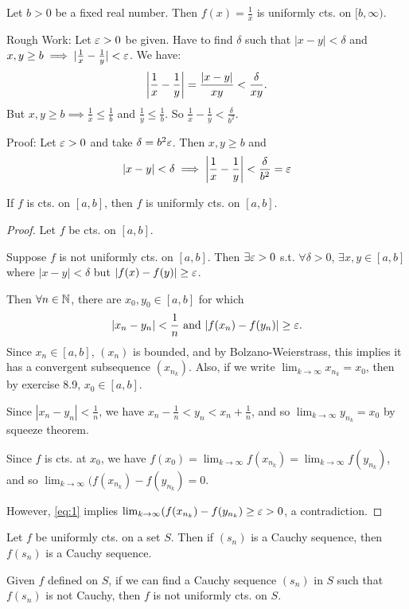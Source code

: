 \documentclass{article}
\begin{document}
\begin{example}
Let $b > 0$ be a fixed real number. Then $f(x) = \frac{1}{x}$ is uniformly cts. on $[b, \infty)$.

Rough Work:
Let $\varepsilon > 0$ be given. Have to find $\delta$ such that $|x-y| < \delta$ and $x, y \geq b \implies |\frac{1}{x} - \frac{1}{y}| < \varepsilon$.
We have:
\[
\abs{\frac{1}{x} - \frac{1}{y}} = \frac{\abs{x-y}}{xy} < \frac{\delta}{xy}.
\]
But $x, y \geq b \implies \frac{1}{x} \leq \frac{1}{b}$ and $\frac{1}{y} \leq \frac{1}{b}$. So $\frac{1}{x} - \frac{1}{y} < \frac{\delta}{b^2}$.

Proof:
Let $\varepsilon > 0$ and take $\delta = b^2\varepsilon$. Then $x, y \geq b$ and \[
|x-y| < \delta \implies \abs{\frac{1}{x} - \frac{1}{y}} < \frac{\delta}{b^2} = \varepsilon
\]
\end{example}
\begin{cthm}[Theorem 19.2]
If $f$ is cts. on $[a, b]$, then $f$ is uniformly cts. on $[a, b]$.
\end{cthm}
\begin{proof}
Let $f$ be cts. on $[a, b]$. 

Suppose $f$ is not uniformly cts. on $[a, b]$. Then $\exists \varepsilon > 0$ s.t. $\forall \delta > 0$, $\exists x, y \in [a, b]$ where $|x-y| < \delta$ but $|f(x) -f(y)| \geq \varepsilon$.

Then $\forall n \in \mathbb{N}$, there are $x_0, y_0 \in [a, b]$ for which \begin{equation} \label{eq:1}
    |x_n - y_n| < \frac{1}{n}\text{ and }|f(x_n) - f(y_n)| \geq \varepsilon.
\end{equation}
Since $x_n \in [a, b]$, $(x_n)$ is bounded, and by Bolzano-Weierstrass, this implies it has a convergent subsequence $(x_{n_k})$.
Also, if we write $\lim_{k\to\infty} x_{n_k} = x_0$, then by exercise 8.9, $x_0 \in [a, b]$.

Since $|x_n -y_n| < \frac{1}{n}$, we have $x_n - \frac{1}{n} < y_n < x_n + \frac{1}{n}$, and so $\lim_{k\to\infty} y_{n_k} = x_0$ by squeeze theorem. 

Since $f$ is cts. at $x_0$, we have $f(x_0) = \lim_{k\to\infty} f(x_{n_k}) = \lim_{k\to\infty} f(y_{n_k})$, and so $\lim_{k\to\infty} (f(x_{n_k}) - f(y_{n_k}) = 0$.

However, \eqref{eq:1} implies $\lim_{k\to\infty} (f(x_{n_k}) - f(y_{n_k}) \geq \varepsilon > 0$, a contradiction.
\end{proof}
\begin{cthm}[Theorem 19.4]
Let $f$ be uniformly cts. on a set $S$. Then if $(s_n)$ is a Cauchy sequence, then $f(s_n)$ is a Cauchy sequence.

Given $f$ defined on $S$, if we can find a Cauchy sequence $(s_n)$ in $S$ such that $f(s_n)$ is not Cauchy, then $f$ is not uniformly cts. on $S$.
\end{cthm}
\end{document}
